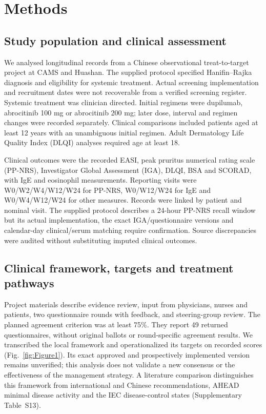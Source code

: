 \section{Methods}
\subsection{Study population and clinical assessment}
We analysed longitudinal records from a Chinese observational treat-to-target project at CAMS and Huashan. The supplied protocol specified Hanifin--Rajka diagnosis and eligibility for systemic treatment. Actual screening implementation and recruitment dates were not recoverable from a verified screening register. Systemic treatment was clinician directed. Initial regimens were dupilumab, abrocitinib 100 mg or abrocitinib 200 mg; later dose, interval and regimen changes were recorded separately. Clinical comparisons included patients aged at least 12 years with an unambiguous initial regimen. Adult Dermatology Life Quality Index (DLQI) analyses required age at least 18.

Clinical outcomes were the recorded EASI, peak pruritus numerical rating scale (PP-NRS), Investigator Global Assessment (IGA), DLQI, BSA and SCORAD, with IgE and eosinophil measurements. Reporting visits were W0/W2/W4/W12/W24 for PP-NRS, W0/W12/W24 for IgE and W0/W4/W12/W24 for other measures. Records were linked by patient and nominal visit. The supplied protocol describes a 24-hour PP-NRS recall window but its actual implementation, the exact IGA/questionnaire versions and calendar-day clinical/serum matching require confirmation. Source discrepancies were audited without substituting imputed clinical outcomes.

\subsection{Clinical framework, targets and treatment pathways}
Project materials describe evidence review, input from physicians, nurses and patients, two questionnaire rounds with feedback, and steering-group review. The planned agreement criterion was at least 75\%. They report 49 returned questionnaires, without original ballots or round-specific agreement results. We transcribed the local framework and operationalized its targets on recorded scores (Fig.~\ref{fig:Figure1}). Its exact approved and prospectively implemented version remains unverified; this analysis does not validate a new consensus or the effectiveness of the management strategy. A literature comparison distinguishes this framework from international and Chinese recommendations, AHEAD minimal disease activity and the IEC disease-control states (Supplementary Table~S13).\citep{debruin2021t2t,zhao2022chinat2t,yeung2023t2t,silverberg2024ahead,merola2026iec}

